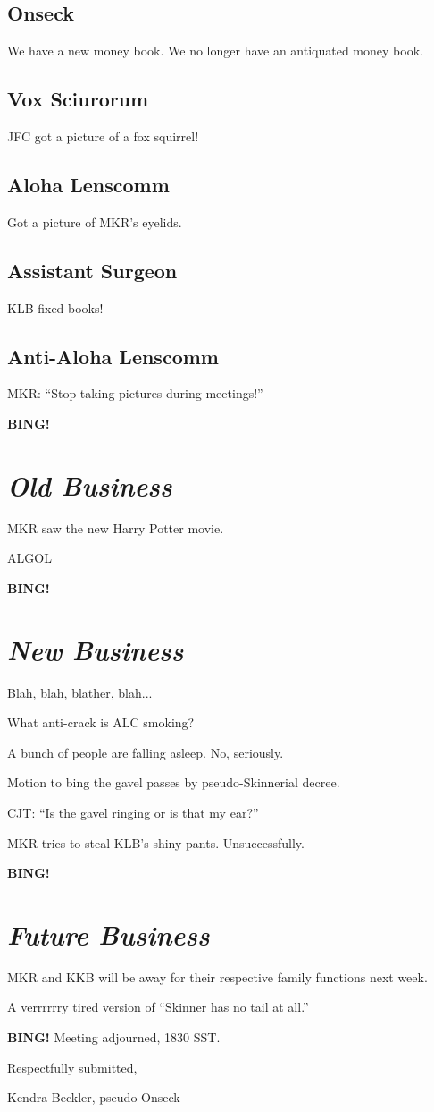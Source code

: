 \documentclass[10pt]{article}
\newcommand{\bing}{{\bf BING!} }
\newcommand{\goto}[1]{\bing \vskip 12pt \section*{{\em{#1}}}}
\begin{document}
\subsection*{Onseck}

We have a new money book.  We no longer have an antiquated money book.

\subsection*{Vox Sciurorum}

JFC got a picture of a fox squirrel!

\subsection*{Aloha Lenscomm}

Got a picture of MKR's eyelids.

\subsection*{Assistant Surgeon}

KLB fixed books!

\subsection*{Anti-Aloha Lenscomm}

MKR: ``Stop taking pictures during meetings!''

\goto{Old Business}

MKR saw the new Harry Potter movie.

ALGOL

\goto{New Business}

Blah, blah, blather, blah...

What anti-crack is ALC smoking?

A bunch of people are falling asleep.  No, seriously.

Motion to bing the gavel passes by pseudo-Skinnerial decree.

CJT: ``Is the gavel ringing or is that my ear?''

MKR tries to steal KLB's shiny pants.  Unsuccessfully.

\goto{Future Business}

MKR and KKB will be away for their respective family functions next week.

A verrrrrry tired version of ``Skinner has no tail at all.''

\bing
\noindent
Meeting adjourned, 1830 SST.

\vspace{18pt}

\centerline{Respectfully submitted,}
\centerline{Kendra Beckler, pseudo-Onseck}
\end{document}

